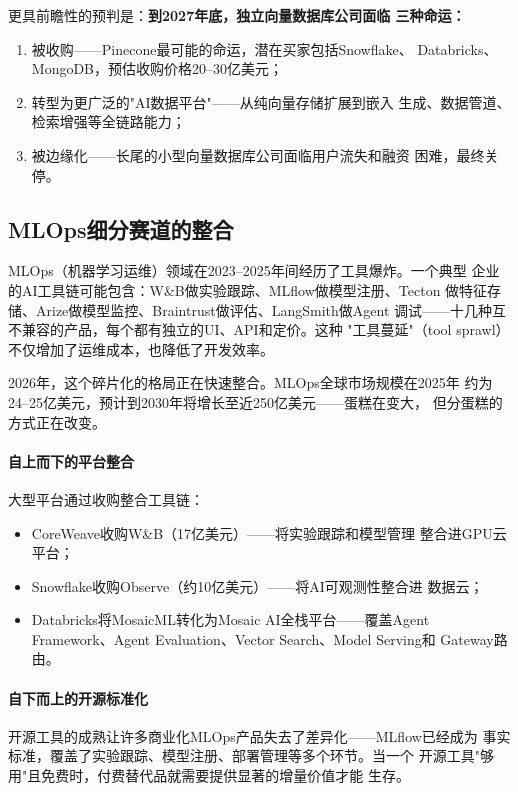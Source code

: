 更具前瞻性的预判是：\textbf{到2027年底，独立向量数据库公司面临
三种命运：}
\begin{enumerate}
  \item 被收购——Pinecone最可能的命运，潜在买家包括Snowflake、
    Databricks、MongoDB，预估收购价格20--30亿美元；
  \item 转型为更广泛的"AI数据平台"——从纯向量存储扩展到嵌入
    生成、数据管道、检索增强等全链路能力；
  \item 被边缘化——长尾的小型向量数据库公司面临用户流失和融资
    困难，最终关停。
\end{enumerate}


\subsection{MLOps细分赛道的整合}
\label{subsec:outlook-mlops-consolidation}

MLOps（机器学习运维）领域在2023--2025年间经历了工具爆炸。一个典型
企业的AI工具链可能包含：W\&B做实验跟踪、MLflow做模型注册、Tecton
做特征存储、Arize做模型监控、Braintrust做评估、LangSmith做Agent
调试——十几种互不兼容的产品，每个都有独立的UI、API和定价。这种
"工具蔓延"（tool sprawl）不仅增加了运维成本，也降低了开发效率。

2026年，这个碎片化的格局正在快速整合。MLOps全球市场规模在2025年
约为24--25亿美元，预计到2030年将增长至近250亿美元——蛋糕在变大，
但分蛋糕的方式正在改变。

\paragraph{自上而下的平台整合}
大型平台通过收购整合工具链：
\begin{itemize}
  \item CoreWeave收购W\&B（17亿美元）——将实验跟踪和模型管理
    整合进GPU云平台；
  \item Snowflake收购Observe（约10亿美元）——将AI可观测性整合进
    数据云；
  \item Databricks将MosaicML转化为Mosaic AI全栈平台——覆盖Agent
    Framework、Agent Evaluation、Vector Search、Model Serving和
    Gateway路由。
\end{itemize}

\paragraph{自下而上的开源标准化}
开源工具的成熟让许多商业化MLOps产品失去了差异化——MLflow已经成为
事实标准，覆盖了实验跟踪、模型注册、部署管理等多个环节。当一个
开源工具"够用"且免费时，付费替代品就需要提供显著的增量价值才能
生存。

